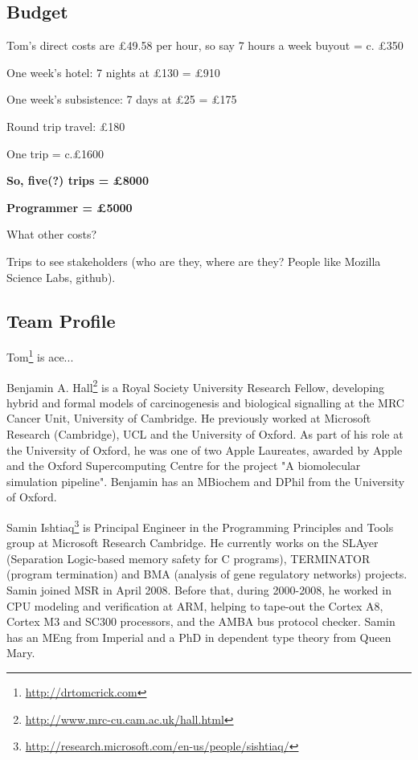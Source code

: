 \documentclass[a4paper,11pt]{article}
\begin{document}



\subsection*{Budget}

Tom's direct costs are \pounds 49.58 per hour, so say 7 hours a week
buyout = c. \pounds 350

One week's hotel: 7 nights at \pounds 130 = \pounds 910

One week's subsistence: 7 days at \pounds 25 = \pounds 175

Round trip travel: \pounds 180

One trip = c.£1600

{\textbf{So, five(?) trips = \pounds 8000}}

{\textbf{Programmer = \pounds 5000}}

What other costs?

Trips to see stakeholders (who are they, where are they? People like Mozilla Science Labs, github). 

\subsection*{Team Profile}


Tom\footnote{\url{http://drtomcrick.com}} is ace...

Benjamin A. Hall\footnote{\url{http://www.mrc-cu.cam.ac.uk/hall.html}} is a Royal Society University Research Fellow, developing hybrid and formal models of carcinogenesis and biological signalling at the MRC Cancer Unit, University of Cambridge. He previously worked at Microsoft Research (Cambridge), UCL and the University of Oxford. As part of his role at the University of Oxford, he was one of two Apple Laureates, awarded by Apple and the Oxford Supercomputing Centre for the project "A biomolecular simulation pipeline". Benjamin has an MBiochem and DPhil from the University of Oxford.

Samin Ishtiaq\footnote{\url{http://research.microsoft.com/en-us/people/sishtiaq/}} is Principal Engineer in the Programming Principles and Tools group at Microsoft Research Cambridge. He currently works on the SLAyer (Separation Logic-based memory safety for C programs), TERMINATOR (program termination) and BMA (analysis of gene regulatory networks) projects. Samin joined MSR in April 2008. Before that, during 2000-2008, he worked in CPU modeling and verification at ARM, helping to tape-out the Cortex A8, Cortex M3 and SC300 processors, and the AMBA bus protocol checker. Samin has an MEng from Imperial and a PhD in dependent type theory from Queen Mary. 



\end{document}
